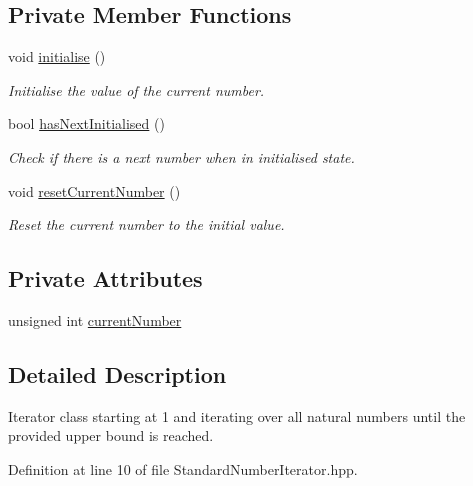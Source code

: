 \subsection*{\-Private \-Member \-Functions}
\begin{DoxyCompactItemize}
\item 
void \hyperlink{classmultiscale_1_1StandardNumberIterator_a90d4512fe2d15f9bc5a78396d0092c6a}{initialise} ()
\begin{DoxyCompactList}\small\item\em \-Initialise the value of the current number. \end{DoxyCompactList}\item 
bool \hyperlink{classmultiscale_1_1StandardNumberIterator_af840d952fae019b7e894a4a238c7d4d8}{has\-Next\-Initialised} ()
\begin{DoxyCompactList}\small\item\em \-Check if there is a next number when in initialised state. \end{DoxyCompactList}\item 
void \hyperlink{classmultiscale_1_1StandardNumberIterator_a678d43170a27106e1d8c5475b7088d9e}{reset\-Current\-Number} ()
\begin{DoxyCompactList}\small\item\em \-Reset the current number to the initial value. \end{DoxyCompactList}\end{DoxyCompactItemize}
\subsection*{\-Private \-Attributes}
\begin{DoxyCompactItemize}
\item 
unsigned int \hyperlink{classmultiscale_1_1StandardNumberIterator_a1f40c321994d53f705331badd64542be}{current\-Number}
\end{DoxyCompactItemize}


\subsection{\-Detailed \-Description}
\-Iterator class starting at 1 and iterating over all natural numbers until the provided upper bound is reached. 

\-Definition at line 10 of file \-Standard\-Number\-Iterator.\-hpp.




